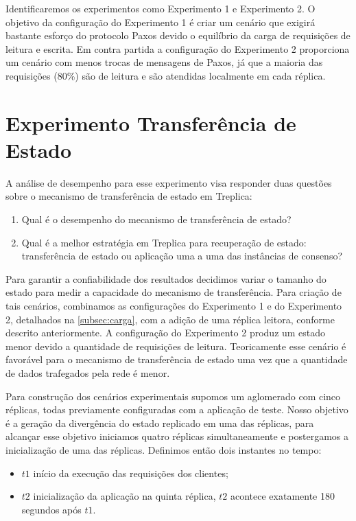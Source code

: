 Identificaremos os experimentos como Experimento 1 e Experimento 2. O objetivo da
configuração do Experimento 1 é criar um cenário que exigirá bastante esforço do protocolo
Paxos devido o equilíbrio da carga de requisições de leitura e escrita. Em contra partida
a configuração do Experimento 2 proporciona um cenário com menos trocas de mensagens de
Paxos, já que a maioria das requisições (80\%) são de leitura e são atendidas localmente
em cada réplica.


\section{Experimento Transferência de Estado}\label{sec:experimento_tranferencia_estado}

A análise de desempenho para esse experimento visa responder duas questões sobre o
mecanismo de transferência de estado em Treplica:

\begin{enumerate}
  \item Qual é o desempenho do mecanismo de transferência de estado?
  \item Qual é a melhor estratégia em Treplica para recuperação de estado: transferência de
    estado ou aplicação uma a uma das instâncias de consenso?
\end{enumerate}

Para garantir a confiabilidade dos resultados decidimos variar o tamanho do estado para
medir a capacidade do mecanismo de transferência. Para criação de tais cenários,
combinamos as configurações do Experimento 1 e do Experimento 2, detalhados na
\autoref{subsec:carga}, com a adição de uma réplica leitora, conforme descrito
anteriormente. A configuração do Experimento 2 produz um estado menor devido a quantidade
de requisições de leitura. Teoricamente esse cenário é favorável para o mecanismo de
transferência de estado uma vez que a quantidade de dados trafegados pela rede é menor.

Para construção dos cenários experimentais supomos um aglomerado com cinco réplicas, todas
previamente configuradas com a aplicação de teste. Nosso objetivo é a geração da
divergência do estado replicado em uma das réplicas, para alcançar esse objetivo iniciamos
quatro réplicas simultaneamente e postergamos a inicialização de uma das réplicas.
Definimos então dois instantes no tempo:

\begin{itemize}
  \item $t1$ início da execução das requisições dos clientes;
  \item $t2$ inicialização da aplicação na quinta réplica, $t2$ acontece exatamente 180
    segundos após $t1$.
\end{itemize}

